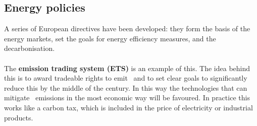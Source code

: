 \documentclass[../summary.tex]{subfiles}
\begin{document}
\subsection{Energy policies}

A series of European directives have been developed: they form the basis of the energy markets, set the goals for energy efficiency measures, and the decarbonisation.
\\\\
The \textbf{emission trading system (ETS)} is an example of this. The idea behind this is to award tradeable rights to emit \COtwo\ and to set clear goals to significantly reduce this by the middle of the century. In this way the technologies that can mitigate \COtwo\ emissions in the most economic way will be favoured. In practice this works like a carbon tax, which is included in the price of electricity or industrial products.
\end{document}
